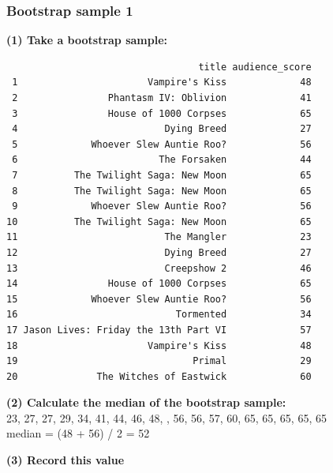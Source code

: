 \documentclass[11pt,containsverbatim,handout,xcolor=xelatex,dvipsnames,table]{beamer}
\begin{document}
\begin{frame}[fragile]
\frametitle{Bootstrap sample 1}

{\small \textbf{(1) Take a bootstrap sample:}}
\pause
{\tiny
\begin{verbatim}
                                  title audience_score
 1                       Vampire's Kiss             48
 2                Phantasm IV: Oblivion             41
 3                House of 1000 Corpses             65
 4                          Dying Breed             27
 5             Whoever Slew Auntie Roo?             56
 6                         The Forsaken             44
 7          The Twilight Saga: New Moon             65
 8          The Twilight Saga: New Moon             65
 9             Whoever Slew Auntie Roo?             56
10          The Twilight Saga: New Moon             65
11                          The Mangler             23
12                          Dying Breed             27
13                          Creepshow 2             46
14                House of 1000 Corpses             65
15             Whoever Slew Auntie Roo?             56
16                            Tormented             34
17 Jason Lives: Friday the 13th Part VI             57
18                       Vampire's Kiss             48
19                               Primal             29
20              The Witches of Eastwick             60
\end{verbatim}
}

\pause

{\small \textbf{(2) Calculate the median of the bootstrap sample:}} \\
\pause
{\footnotesize
23, 27, 27, 29, 34, 41, 44, 46, 48, , 56, 56, 57, 60, 65, 65, 65, 65, 65 \\
median = (48 + 56) / 2 = 52 \\
}

\pause

{\small
\textbf{(3) Record this value}
}

\end{frame}

\end{document}
